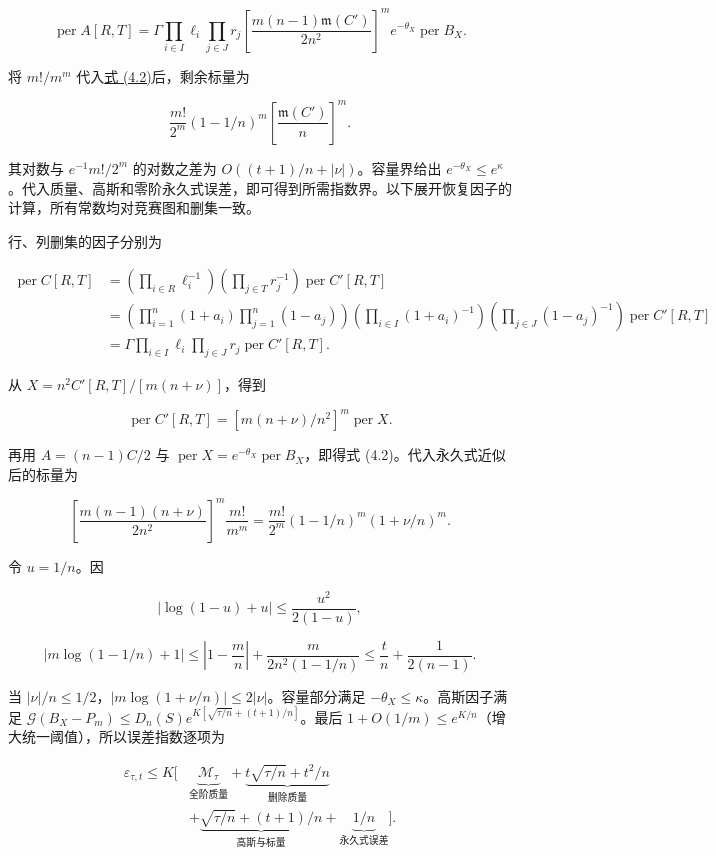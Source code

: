 \documentclass[11pt,a4paper]{article}
\begin{document}

\begin{equation}
\operatorname{per}A[R,T]=\Gamma\prod_{i\in I}\ell_i\prod_{j\in J}r_j\left[\frac{m(n-1)\mathfrak m(C')}{2n^2}\right]^m e^{-\theta_X}\operatorname{per}B_X.
\tag{4.2}
\label{eq-exact-restoration}
\end{equation}

将 \(m!/m^m\) 代入\hyperref[eq-exact-restoration]{式 (4.2)}后，剩余标量为

\[\frac{m!}{2^m}(1-1/n)^m\left[\frac{\mathfrak m(C')}{n}\right]^m.\]

其对数与 \(e^{-1}m!/2^m\) 的对数之差为 \(O((t+1)/n+|\nu|)\)。容量界给出 \(e^{-\theta_X}\le e^\kappa\)。代入质量、高斯和零阶永久式误差，即可得到所需指数界。以下展开恢复因子的计算，所有常数均对竞赛图和删集一致。

行、列删集的因子分别为

\[\begin{aligned}
\operatorname{per}C[R,T]
&=\left(\prod_{i\in R}\ell_i^{-1}\right)
\left(\prod_{j\in T}r_j^{-1}\right)\operatorname{per}C'[R,T]\\
&=\left(\prod_{i=1}^n(1+a_i)\prod_{j=1}^n(1-a_j)\right)
\left(\prod_{i\in I}(1+a_i)^{-1}\right)
\left(\prod_{j\in J}(1-a_j)^{-1}\right)\operatorname{per}C'[R,T]\\
&=\Gamma\prod_{i\in I}\ell_i\prod_{j\in J}r_j\operatorname{per}C'[R,T].
\end{aligned}\]

从 \(X=n^2C'[R,T]/[m(n+\nu)]\)，得到

\[\operatorname{per}C'[R,T]=[m(n+\nu)/n^2]^m\operatorname{per}X.\]

再用 \(A=(n-1)C/2\) 与 \(\operatorname{per}X=e^{-\theta_X}\operatorname{per}B_X\)，即得式 (4.2)。代入永久式近似后的标量为

\[\left[\frac{m(n-1)(n+\nu)}{2n^2}\right]^m\frac{m!}{m^m}
=\frac{m!}{2^m}(1-1/n)^m(1+\nu/n)^m.\]

令 \(u=1/n\)。因

\[|\log(1-u)+u|\le\frac{u^2}{2(1-u)},\]

\[\left|m\log(1-1/n)+1\right|
\le\left|1-\frac mn\right|+\frac{m}{2n^2(1-1/n)}
\le\frac tn+\frac1{2(n-1)}.\]

当 \(|\nu|/n\le1/2\)，\(|m\log(1+\nu/n)|\le2|\nu|\)。容量部分满足 \(-\theta_X\le\kappa\)。高斯因子满足 \(\mathcal G(B_X-P_m)\le D_n(S)e^{K[\sqrt{\tau/n}+(t+1)/n]}\)。最后 \(1+O(1/m)\le e^{K/n}\)（增大统一阈值），所以误差指数逐项为

\[\begin{aligned}
\varepsilon_{\tau,t}\le K\bigg[&\underbrace{\mathcal M_\tau}_{\text{全阶质量}}
+\underbrace{t\sqrt{\tau/n}+t^2/n}_{\text{删除质量}}\\
&+\underbrace{\sqrt{\tau/n}+(t+1)/n}_{\text{高斯与标量}}
+\underbrace{1/n}_{\text{永久式误差}}\bigg].
\end{aligned}\]
\end{document}

